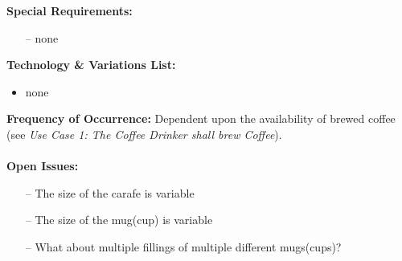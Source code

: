 \documentclass[letterpaper]{article}
\begin{document}
\textbf{Special Requirements:}
\begin{itemize}
\item[--]none
\end{itemize}
\textbf{Technology \& Variations List:}
\begin{itemize}
\item none
\end{itemize}
\textbf{Frequency of Occurrence:  }Dependent upon the availability of
brewed coffee (see \textit{Use Case 1:  The Coffee Drinker shall
brew Coffee}).\\\\
\textbf{Open Issues:  }
\begin{itemize}
\item[--]The size of the carafe is variable
\item[--]The size of the mug(cup) is variable
\item[--]What about multiple fillings of multiple different
mugs(cups)?
\end{itemize}
\end{document}
